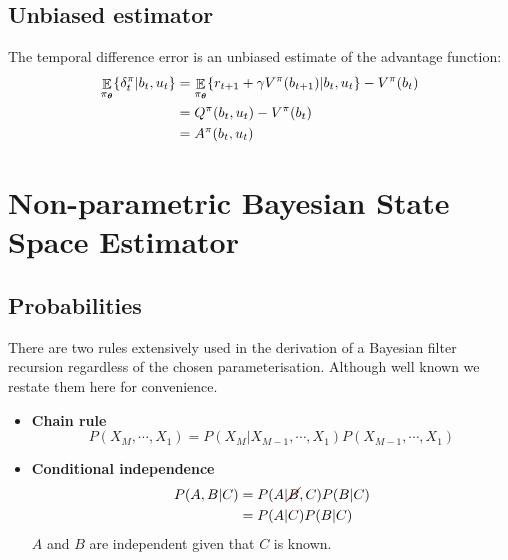 \begin{appendices}
\section{Unbiased estimator}\label{app:unbiased_delta}

The temporal difference error is an unbiased estimate of the advantage function:
\begin{align}
  \displaystyle \mathop \mathbb{E}_{\pi_{\boldsymbol{\theta}}} \{ \delta^{\pi}_t|b_t,u_t\} &=  \mathop\mathbb{E}_{\pi_{\boldsymbol{\theta}}}\{ r_{t+1} + \gamma V^{\pi}(b_{t+1})|b_t,u_t\} - V^{\pi}(b_t) \nonumber \\
									   &= Q^{\pi}(b_t,u_t) - V^{\pi}(b_t) \nonumber \\
									   &= A^{\pi}(b_t,u_t)
\end{align}


\chapter{Non-parametric Bayesian State Space Estimator}\label{ch5:appendix}


\section{Probabilities}

There are two rules extensively used in the derivation of a Bayesian filter recursion regardless 
of the chosen parameterisation. Although well known we restate them here for convenience.

\begin{itemize}
 \item \textbf{Chain rule}\\
 \begin{equation}
  P(X_M,\cdots,X_1) = P(X_M|X_{M-1},\cdots,X_1) P(X_{M-1},\cdots,X_1) \label{eq:ch5:chain_rule}
 \end{equation}
 \item \textbf{Conditional independence}\\
  \begin{align}
    P(A,B|C) &= P(A|\Ccancel[red]{B},C) P(B|C) \nonumber \\
             &= P(A|C) P(B|C)
  \end{align}
  $A$ and $B$ are independent given that $C$ is known.
\end{itemize}



\end{appendices}
